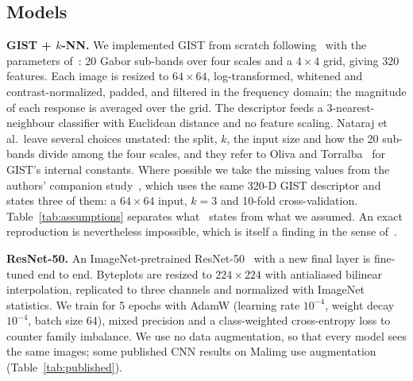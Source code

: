 \documentclass[conference]{IEEEtran}
\begin{document}
\subsection{Models}
\textbf{GIST + $k$-NN.} We implemented GIST from scratch following~\cite{oliva2001gist}
with the parameters of~\cite{nataraj2011images}: 20 Gabor sub-bands over four scales
and a $4 \times 4$ grid, giving 320 features. Each image is resized to $64 \times 64$,
log-transformed, whitened and contrast-normalized, padded, and filtered in the
frequency domain; the magnitude of each response is averaged over the grid. The
descriptor feeds a 3-nearest-neighbour classifier with Euclidean distance and no
feature scaling. Nataraj et al.\ leave several choices unstated: the split, $k$, the
input size and how the 20 sub-bands divide among the four scales, and they refer to
Oliva and Torralba~\cite{oliva2001gist} for GIST's internal constants. Where possible
we take the missing values from the authors' companion
study~\cite{nataraj2011comparative}, which uses the same 320-D GIST descriptor and
states three of them: a $64 \times 64$ input, $k = 3$ and 10-fold cross-validation.
Table~\ref{tab:assumptions} separates what~\cite{nataraj2011images} states from what we
assumed. An exact reproduction is nevertheless impossible, which is itself a finding in
the sense of~\cite{arp2022dos}.

\textbf{ResNet-50.} An ImageNet-pretrained ResNet-50~\cite{he2016resnet} with a new
final layer is fine-tuned end to end. Byteplots are resized to $224 \times 224$ with
antialiased bilinear interpolation, replicated to three channels and normalized with
ImageNet statistics. We train for 5 epochs with AdamW (learning rate $10^{-4}$, weight
decay $10^{-4}$, batch size 64), mixed precision and a class-weighted cross-entropy
loss to counter family imbalance. We use no data augmentation, so that every model
sees the same images; some published CNN results on Malimg use augmentation
(Table~\ref{tab:published}).
\end{document}

